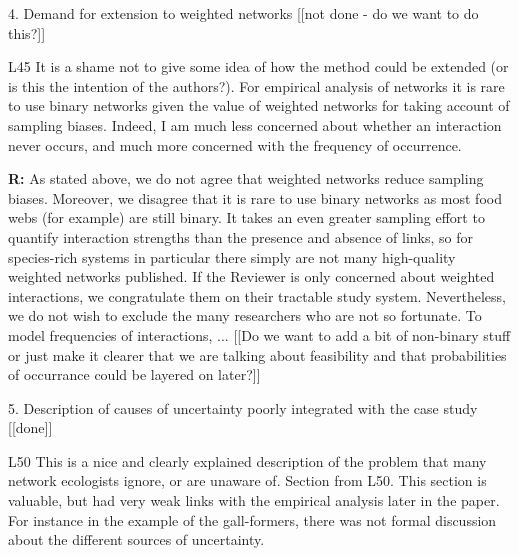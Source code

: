 \documentclass[12pt]{letter}
\newenvironment{refquote}{\bigskip \begin{it}}{\end{it}\smallskip}
\begin{document}
\begin{itemize}
	4. Demand for extension to weighted networks [[not done - do we want to do this?]]

		\begin{refquote}
		L45 It is a shame not to give some idea of how the method could be extended (or is this the intention of the authors?). For empirical analysis of networks it is rare to use binary networks given the value of weighted networks for taking account of sampling biases. Indeed, I am much less concerned about whether an interaction never occurs, and much more concerned with the frequency of occurrence.
		\end{refquote}

		\textbf{R:} As stated above, we do not agree that weighted networks reduce sampling biases. Moreover, we disagree that it is rare to use binary networks as most food webs (for example) are still binary. It takes an even greater sampling effort to quantify interaction strengths than the presence and absence of links, so for species-rich systems in particular there simply are not many high-quality weighted networks published. If the Reviewer is only concerned about weighted interactions, we congratulate them on their tractable study system. Nevertheless, we do not wish to exclude the many researchers who are not so fortunate.
		\smallskip
		To model frequencies of interactions, ...
			 [[Do we want to add a bit of non-binary stuff or just make it clearer that we are talking about feasibility and that probabilities of occurrance could be layered on later?]]


	5. Description of causes of uncertainty poorly integrated with the case study [[done]]

		\begin{refquote}
		L50 This is a nice and clearly explained description of the problem that many network ecologists ignore, or are unaware of.
		Section from L50. This section is valuable, but had very weak links with the empirical analysis later in the paper. For instance in the example of the gall-formers, there was not formal discussion about the different sources of uncertainty. 
		\end{refquote}


\end{itemize}
\end{document}
